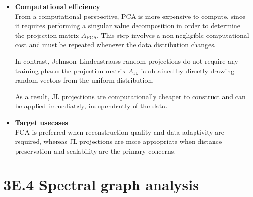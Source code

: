 \documentclass[a4paper]{scrartcl}
\begin{document}
\begin{itemize}
Unlike PCA, JL projections do not minimize a reconstruction error, but instead control the distortion of pairwise distances.

\item \textbf{Computational efficiency} \\
From a computational perspective, PCA is more expensive to compute, since it requires performing a singular value decomposition in order to determine the projection matrix $A_{\text{PCA}}$. This step involves a non-negligible computational cost and must be repeated whenever the data distribution changes.

In contrast, Johnson--Lindenstrauss random projections do not require any training phase: the projection matrix $A_{\text{JL}}$ is obtained by directly drawing random vectors from the uniform distribution. 

As a result, JL projections are computationally cheaper to construct and can be applied immediately, independently of the data.

\item \textbf{Target usecases} \\
PCA is preferred when reconstruction quality and data adaptivity are required, whereas JL projections are more appropriate when distance preservation and scalability are the primary concerns.
\end{itemize}

\section*{3E.4 \quad Spectral graph analysis}
\end{document}
